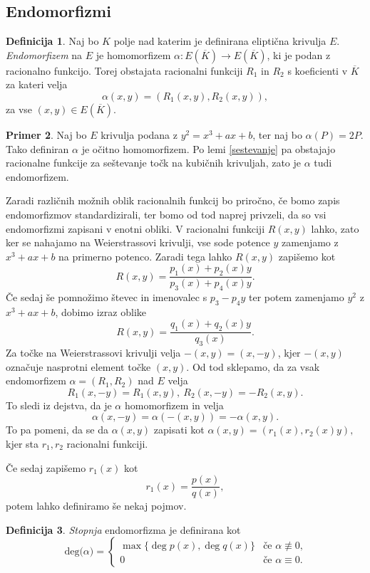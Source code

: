 \documentclass[12pt,a4paper,twoside]{article}
\theoremstyle{definition} %
\newtheorem{definicija}{Definicija}[section]
\newtheorem{primer}[definicija]{Primer}
\theoremstyle{plain} %
\numberwithin{equation}{section}  %
\newcommand{\E}[1]{E({#1})}
\newcommand{\DEG}[1]{\ \text{deg(}{#1}\text{)}}
\begin{document}
\subsection{Endomorfizmi}
\label{endomorfizmi}

\begin{definicija}
Naj bo $K$ polje nad katerim je definirana eliptična krivulja $E$.
\emph{Endomorfizem} na $E$ je homomorfizem $\alpha: \E{\overline{K}} \rightarrow \E{\overline{K}} $, ki je podan z racionalno funkcijo. Torej obstajata racionalni funkciji $R_1$ in $R_2$ s koeficienti v $\overline{K}$ za kateri velja
$$\alpha(x,y) = (R_1(x,y),R_2(x,y)),$$
za vse $(x,y) \in \E{\overline{K}}$.
\end{definicija}

\begin{primer}
Naj bo $E$ krivulja podana z $y^2 = x^3+ax+b$, ter naj bo $\alpha(P) = 2P$. Tako definiran $\alpha$ je očitno homomorfizem. Po lemi \ref{sestevanje} pa obstajajo racionalne funkcije za seštevanje točk na kubičnih krivuljah, zato je $\alpha$ tudi endomorfizem.
\end{primer}

Zaradi različnih možnih oblik racionalnih funkcij bo priročno, če bomo zapis endomorfizmov standardizirali, ter bomo od tod naprej privzeli, da so vsi endomorfizmi zapisani v enotni obliki.
V racionalni funkciji $R(x,y)$ lahko, zato ker se nahajamo na Weierstrassovi krivulji, vse sode potence $y$ zamenjamo z $x^3+ax+b$ na primerno potenco. Zaradi tega lahko $R(x,y)$ zapišemo kot
$$R(x,y) = \frac{p_1(x)+p_2(x)y}{p_3(x)+p_4(x)y}.$$
Če sedaj še pomnožimo števec in imenovalec s $p_3-p_4y$ ter potem zamenjamo $y^2$ z $x^3+ax+b$, dobimo izraz oblike
$$R(x,y) = \frac{q_1(x)+q_2(x)y}{q_3(x)}.$$
Za točke na Weierstrassovi krivulji velja $-(x,y) = (x,-y)$, kjer $-(x,y)$ označuje nasprotni element točke $(x,y)$. Od tod sklepamo, da za vsak endomorfizem $\alpha = (R_1,R_2) $ nad $E$ velja
$$R_1(x,-y) = R_1(x,y), \ R_2(x,-y) = -R_2(x,y).$$
To sledi iz dejstva, da je $\alpha$ homomorfizem in velja
$$\alpha(x,-y) = \alpha(-(x,y)) = -\alpha(x,y).$$
To pa pomeni, da se da $\alpha(x,y)$ zapisati kot
$\alpha(x,y) = (r_1(x),r_2(x)y),$
kjer sta $r_1,r_2$ racionalni funkciji.

Če sedaj zapišemo $r_1(x)$ kot
$$r_1(x) = \frac{p(x)}{q(x)},$$
potem lahko definiramo še nekaj pojmov. 

\begin{definicija}
\emph{Stopnja} endomorfizma je  definirana kot
$$
\DEG{\alpha} =
\begin{cases}
\max \{ \deg{p(x)},\deg{q(x)} \} & \text{če }\alpha \not\equiv 0, \\
0 & \text{če } \alpha \equiv 0.
\end{cases}
$$
\end{definicija}
\end{document}
